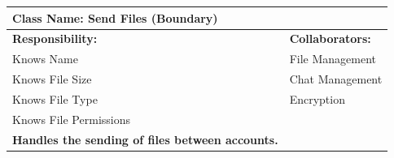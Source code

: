 \documentclass[]{article}
\begin{document}
	\begin{table}[ht]
		\centering
		\begin{tabular}{|p{7cm}|p{7cm}|}
		\hline 
		 \multicolumn{2}{|l|}{\textbf{Class Name:} Send Files (Boundary)} \\
		\hline
		\textbf{Responsibility:} & \textbf{Collaborators:} \\
		\hline
            Knows Name & File Management\\
            Knows File Size & Chat Management\\
            Knows File Type & Encryption\\
            Knows File Permissions\\
            
            \vspace{0.1in}
            \textbf{Handles the sending of files between accounts.}

		\vspace{1in} & \\
		\hline
  
		\end{tabular}
	\end{table}
\end{document}
